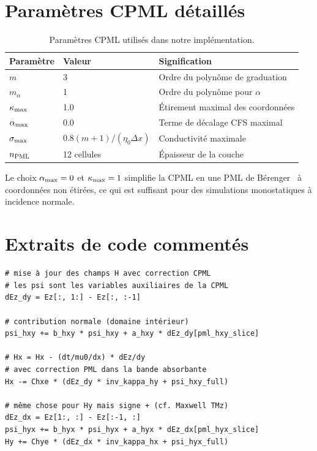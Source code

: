 \documentclass[12pt,a4paper]{article}
\newcommand{\etao}{\eta_0}
\newcommand{\dx}{\Delta x}
\begin{document}
\section{Paramètres CPML détaillés}
\label{app:cpml}

\begin{table}[htbp]
\centering
\caption{Paramètres CPML utilisés dans notre implémentation.}
\label{tab:cpml-params}
\begin{tabular}{lll}
\toprule
\textbf{Paramètre} & \textbf{Valeur} & \textbf{Signification} \\
\midrule
$m$ & 3 & Ordre du polynôme de graduation \\
$m_\alpha$ & 1 & Ordre du polynôme pour $\alpha$ \\
$\kappa_{\rm max}$ & 1.0 & Étirement maximal des coordonnées \\
$\alpha_{\rm max}$ & 0.0 & Terme de décalage CFS maximal \\
$\sigma_{\rm max}$ & $0.8(m+1)/(\etao\dx)$ & Conductivité maximale \\
$n_{\rm PML}$ & 12 cellules & Épaisseur de la couche \\
\bottomrule
\end{tabular}
\end{table}

Le choix $\alpha_{\rm max} = 0$ et $\kappa_{\rm max} = 1$ simplifie la CPML en
une PML de Bérenger~\cite{Berenger1994} à coordonnées non étirées, ce qui est
suffisant pour des simulations monostatiques à incidence normale.

\section{Extraits de code commentés}
\label{app:code}

\begin{lstlisting}[caption={Mise à jour CPML (src/fdtd/core.py -- extraits)}]
# mise à jour des champs H avec correction CPML
# les psi sont les variables auxiliaires de la CPML
dEz_dy = Ez[:, 1:] - Ez[:, :-1]

# contribution normale (domaine intérieur)
psi_hxy += b_hxy * psi_hxy + a_hxy * dEz_dy[pml_hxy_slice]

# Hx = Hx - (dt/mu0/dx) * dEz/dy
# avec correction PML dans la bande absorbante
Hx -= Chxe * (dEz_dy * inv_kappa_hy + psi_hxy_full)

# même chose pour Hy mais signe + (cf. Maxwell TMz)
dEz_dx = Ez[1:, :] - Ez[:-1, :]
psi_hyx += b_hyx * psi_hyx + a_hyx * dEz_dx[pml_hyx_slice]
Hy += Chye * (dEz_dx * inv_kappa_hx + psi_hyx_full)
\end{lstlisting}
\end{document}
